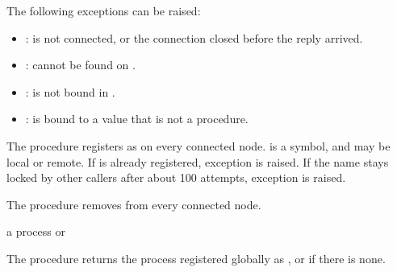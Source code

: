 The following exceptions can be raised:\antipar

\begin{itemize}
\item {}:  is not connected,
  or the connection closed before the reply arrived.
\item {}:  cannot be found
  on .
\item {}:
   is not bound in .
\item {}: 
  is bound to a value that is not a procedure.
\end{itemize}

\begin{procedure}
\end{procedure}
\returns{} 

The  procedure registers  as
 on every connected node.  is a symbol, and
 may be local or remote. If  is already
registered, exception  is
raised. If the name stays locked by other callers after about 100
attempts, exception  is
raised.

\begin{procedure}
\end{procedure}
\returns{} 

The  procedure removes  from every
connected node.

\begin{procedure}
\end{procedure}
\returns{} a process or 

The  procedure returns the process registered
globally as , or  if there is none.
